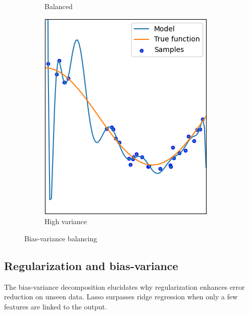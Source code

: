 \begin{figure}[H]
\begin{subfigure}{0.32\textwidth}
        \caption{Balanced}
    \end{subfigure}
    \begin{subfigure}{0.32\textwidth}
        \centering
        \includegraphics[width=0.75\linewidth]{images/hv.png} 
        \caption{High variance}
    \end{subfigure}

    \caption{Bias-variance balancing}
\end{figure}




\subsection{Regularization and bias-variance}
The bias-variance decomposition elucidates why regularization enhances error reduction on unseen data. 
Lasso surpasses ridge regression when only a few features are linked to the output.